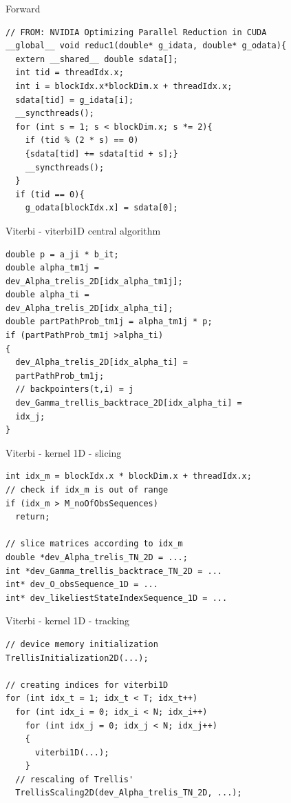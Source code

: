 \documentclass[11pt]{beamer}
\begin{document}
\begin{frame}[fragile]{Forward}
\begin{lstlisting}
// FROM: NVIDIA Optimizing Parallel Reduction in CUDA
__global__ void reduc1(double* g_idata, double* g_odata){
  extern __shared__ double sdata[];
  int tid = threadIdx.x;
  int i = blockIdx.x*blockDim.x + threadIdx.x;
  sdata[tid] = g_idata[i];
  __syncthreads();
  for (int s = 1; s < blockDim.x; s *= 2){
    if (tid % (2 * s) == 0)
    {sdata[tid] += sdata[tid + s];}
    __syncthreads();
  }
  if (tid == 0){
    g_odata[blockIdx.x] = sdata[0];
\end{lstlisting}
\end{frame}

\begin{frame}[fragile]{Viterbi - viterbi1D central algorithm}
\begin{lstlisting}	
double p = a_ji * b_it;
double alpha_tm1j = 
dev_Alpha_trelis_2D[idx_alpha_tm1j];
double alpha_ti = 
dev_Alpha_trelis_2D[idx_alpha_ti];
double partPathProb_tm1j = alpha_tm1j * p;
if (partPathProb_tm1j >alpha_ti)
{
  dev_Alpha_trelis_2D[idx_alpha_ti] = 
  partPathProb_tm1j;
  // backpointers(t,i) = j
  dev_Gamma_trellis_backtrace_2D[idx_alpha_ti] = 
  idx_j;
}	
\end{lstlisting}
\end{frame}

\begin{frame}[fragile]{Viterbi - kernel 1D - slicing}
\begin{lstlisting}
int idx_m = blockIdx.x * blockDim.x + threadIdx.x;
// check if idx_m is out of range 
if (idx_m > M_noOfObsSequences)
  return;
  
// slice matrices according to idx_m
double *dev_Alpha_trelis_TN_2D = ...;
int *dev_Gamma_trellis_backtrace_TN_2D = ...
int* dev_O_obsSequence_1D = ...
int* dev_likeliestStateIndexSequence_1D = ...
\end{lstlisting}
\end{frame}

\begin{frame}[fragile]{Viterbi - kernel 1D - tracking}
	\begin{lstlisting}
// device memory initialization
TrellisInitialization2D(...);

// creating indices for viterbi1D
for (int idx_t = 1; idx_t < T; idx_t++)
  for (int idx_i = 0; idx_i < N; idx_i++)
    for (int idx_j = 0; idx_j < N; idx_j++)
    {
      viterbi1D(...);
    }
  // rescaling of Trellis'
  TrellisScaling2D(dev_Alpha_trelis_TN_2D, ...);

\end{lstlisting}
\end{frame}
\end{document}
